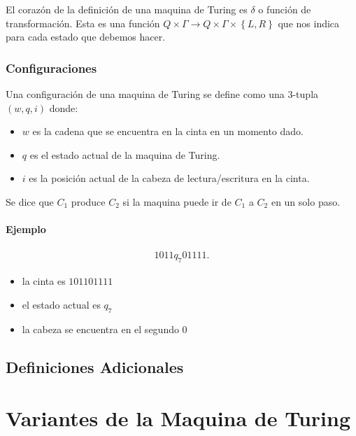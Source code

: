 \documentclass{report}
\begin{document}
El corazón de la definición de una maquina de Turing es $\delta$ o función de transformación. Esta es una función  $Q\times \Gamma \to Q\times\Gamma\times\left\{ L,R \right\} $ que nos indica para cada estado que debemos hacer.


\subsection{Configuraciones}

Una configuración de una maquina de Turing se define como una 3-tupla $(w,q,i)$ donde:
 \begin{itemize}
  \item $w$ es la cadena que se encuentra en la cinta en un momento dado.
  \item  $q$ es el estado actual de la maquina de Turing.
  \item $i$ es la posición actual de la cabeza de lectura/escritura en la cinta.
\end{itemize}

Se dice que $C_1$ produce $C_2$ si la maquina puede ir de $C_1$ a $C_2$ en un solo paso. 

\subsubsection{Ejemplo}
\begin{align*}
  1011q_{7}01111
.\end{align*}
\begin{itemize}
  \item la cinta es $101101111$
  \item el estado actual es $q_7$ 
  \item la cabeza se encuentra en el segundo 0
\end{itemize}
\section{Definiciones Adicionales}
\chapter{Variantes de la Maquina de Turing}
\end{document}
